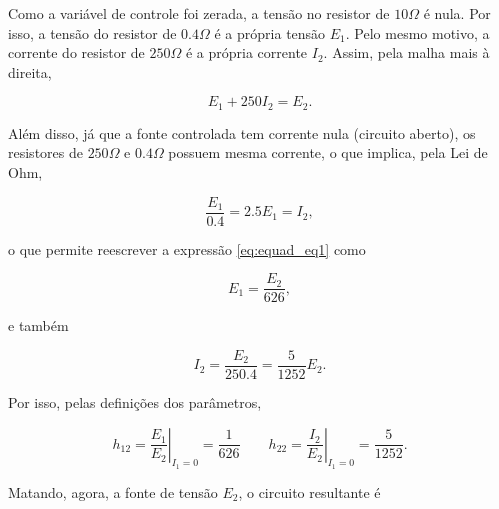 \documentclass{article}
\numberwithin{equation}{section}
\let\l\left
\let\r\right
\let\dfr\dfrac
\begin{document}
\noindent Como a variável de controle foi zerada, a tensão no resistor de $10\Omega$ é nula. Por isso, a tensão do resistor de $0.4\Omega$ é a própria tensão $E_1$. Pelo mesmo motivo, a corrente do resistor de $250\Omega$ é a própria corrente $I_2$. Assim, pela malha mais à direita,

\begin{equation}
    E_1 + 250I_2 = E_2. \label{eq:equad_eq1}
\end{equation}

\noindent Além disso, já que a fonte controlada tem corrente nula (circuito aberto), os resistores de $250\Omega$ e $0.4\Omega$ possuem mesma corrente, o que implica, pela Lei de Ohm,

\begin{equation*}
    \dfr{E_1}{0.4} = 2.5E_1 = I_2,
\end{equation*}

\noindent o que permite reescrever a expressão \eqref{eq:equad_eq1} como

\begin{equation*}
    E_1 = \dfr{E_2}{626},
\end{equation*}

\noindent e também

\begin{equation*}
    I_2 = \dfr{E_2}{250.4}= \dfr{5}{1252}E_2.
\end{equation*}

\noindent Por isso, pelas definições dos parâmetros,

\begin{equation}
    h_{12}=\l.\dfr{E_{1}}{E_{2}}\r|_{I_{1}=0} = \dfr{1}{626}
    \qquad
    h_{22}=\l.\dfr{I_{2}}{E_{2}}\r|_{I_{1}=0} = \dfr{5}{1252}.
    \label{eq:equad_param1}
\end{equation}

\noindent Matando, agora, a fonte de tensão $E_2$, o circuito resultante é

\begin{center}
\end{center}
\end{document}
